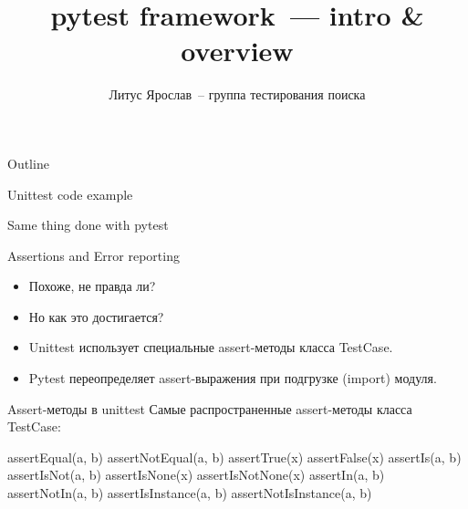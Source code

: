 \documentclass{beamer}
\title{pytest framework~--- intro \& overview}
\author{Литус Ярослав~-- группа тестирования поиска}
\institute{ООО <<ПП~Спутник>>}
\begin{document}
\begin{frame}
    \titlepage
\end{frame}

\begin{frame}{Outline}
    \tableofcontents
\end{frame}




\begin{frame}[fragile]{Unittest code example}
\end{frame}

\begin{frame}[fragile]{Same thing done with pytest}
\end{frame}

\begin{frame}[fragile]{Assertions and Error reporting}
    \begin{itemize}
    \item<3->{Похоже, не правда ли?}
    \item<4->{Но как это достигается?}
    \item<5->{Unittest использует специальные assert-методы класса TestCase.}
    \item<6->{Pytest переопределяет assert-выражения при подгрузке (import) модуля.}
    \end{itemize}
\end{frame}

\begin{frame}[fragile]{Assert-методы в unittest}
    Самые распространенные assert-методы класса TestCase:
    \begin{pycode}
        assertEqual(a, b)
        assertNotEqual(a, b)
        assertTrue(x)
        assertFalse(x)
        assertIs(a, b)
        assertIsNot(a, b)
        assertIsNone(x)
        assertIsNotNone(x)
        assertIn(a, b)
        assertNotIn(a, b)
        assertIsInstance(a, b)
        assertNotIsInstance(a, b)
    \end{pycode}
\end{frame}
\end{document}
